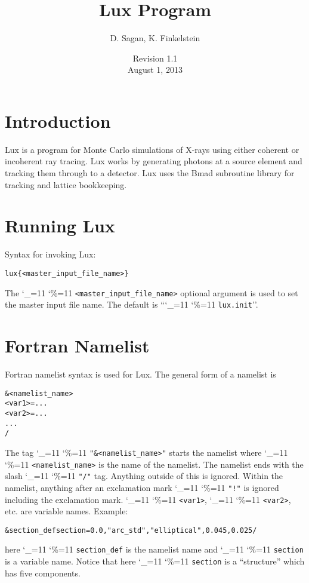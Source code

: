 \documentclass[11pt]{article}
\title{Lux Program}
\author{D. Sagan, K. Finkelstein}
\date{Revision 1.1 \\ August 1, 2013}
\newcommand{\lux}{Lux\xspace}
\newcommand\ttcmd{\begingroup\catcode`\_=11 \catcode`\%=11 \dottcmd}
\newcommand\dottcmd[1]{\texttt{#1}\endgroup}
\newcommand{\vn}{\ttcmd}
\newenvironment{example}
  {\vspace{\ExBeg} \begin{alltt}}
  {\end{alltt} \vspace{\ExEnd}}
\newlength{\ExBeg}
\newlength{\ExEnd}
\begin{document}
\maketitle

\tableofcontents

\section{Introduction} 
\label{s:intro}

\lux is a program for Monte Carlo simulations of X-rays using either
coherent or incoherent ray tracing. \lux works by generating
photons at a source element and tracking them through to a
detector. \lux uses the Bmad subroutine library\cite{b:bmad} for
tracking and lattice bookkeeping.

\section{Running \lux} 
\label{s:run}

Syntax for invoking \lux:
\begin{example}
  lux \{<master_input_file_name>\}
\end{example}
The \vn{<master_input_file_name>} optional argument is used to set the
master input file name. The default is ``\vn{lux.init}''. 

\section{Fortran Namelist}
\label{s:namelist}

Fortran namelist syntax is used for \lux. The general form
of a namelist is
\begin{example}
  &<namelist_name>
    <var1> = ...
    <var2> = ...
    ...
  /
\end{example}
The tag \vn{"\&<namelist_name>"} starts the namelist where
\vn{<namelist_name>} is the name of the namelist. The namelist ends
with the slash \vn{"/"} tag. Anything outside of this is
ignored. Within the namelist, anything after an exclamation mark
\vn{"!"} is ignored including the exclamation mark. \vn{<var1>},
\vn{<var2>}, etc. are variable names. Example:
\begin{example}
  &section_def section =   0.0, "arc_std", "elliptical", 0.045, 0.025 /
\end{example}
here \vn{section_def} is the namelist name and \vn{section} is a variable
name.  Notice that here \vn{section} is a ``structure'' which has five
components.
\end{document}
